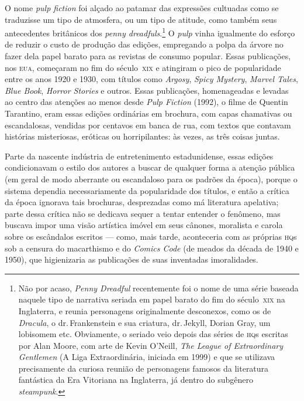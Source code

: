 O nome \emph{pulp fiction} foi alçado ao patamar das expressões
cultuadas como se traduzisse um tipo de atmosfera, ou um tipo de
atitude, como também seus antecedentes britânicos dos \emph{penny
dreadfuls}.\footnote{Não por acaso, \emph{Penny Dreadful} recentemente
  foi o nome de uma série baseada naquele tipo de narrativa seriada em
  papel barato do fim do século~\textsc{xix} na Inglaterra, e reunia personagens
  originalmente desconexos, como os de \emph{Dracula}, o 
  dr.\,Frankenstein e sua criatura, dr.\,Jekyll, Dorian Gray, um lobisomem
  etc. Obviamente, o seriado veio depois das séries de \textsc{hq}s escritas por
  Alan Moore, com arte de Kevin O'Neill, \emph{The League of
  Extraordinary Gentlemen} (A Liga Extraordinária, iniciada em 1999) e
  que se utilizava precisamente da curiosa reunião de personagens
  famosos da literatura fantástica da Era Vitoriana na Inglaterra, já
  dentro do subgênero \emph{steampunk}.} O \emph{pulp} vinha igualmente
do esforço de reduzir o custo de produção das edições, empregando a
polpa da árvore no fazer dela papel barato para as revistas de consumo
popular. Essas publicações, nos \textsc{eua}, começaram no fim do século~\textsc{xix}
e atingiram o pico de popularidade entre os anos 1920 e 1930, com
títulos como \emph{Argosy}, \emph{Spicy Mystery}, \emph{Marvel Tales},
\emph{Blue Book}, \emph{Horror Stories} e outros. Essas publicações,
homenageadas e levadas ao centro das atenções ao menos desde \emph{Pulp
Fiction} (1992), o filme de Quentin Tarantino, eram essas edições
ordinárias em brochura, com capas chamativas ou escandalosas, vendidas
por centavos em banca de rua, com textos que contavam histórias
misteriosas, eróticas ou horripilantes: às vezes, as três coisas juntas.

Parte da nascente indústria de entretenimento estadunidense,
essas edições condicionavam o estilo dos autores a buscar de qualquer forma a atenção
pública (em geral de modo aberrante ou escandaloso para os padrões da
época), porque o sistema dependia necessariamente da popularidade dos
títulos, e então a crítica da época ignorava tais brochuras,
desprezadas como má literatura apelativa; parte dessa crítica não se
dedicava sequer a tentar entender o fenômeno, mas buscava impor uma
visão artística imóvel em seus cânones, moralista e carola sobre os
escândalos escritos --- como, mais tarde, aconteceria com as próprias
\textsc{hq}s sob a censura do macarthismo e do \emph{Comics Code} (de meados da
década de 1940 e 1950), que higienizaria as publicações de suas
inventadas imoralidades.

